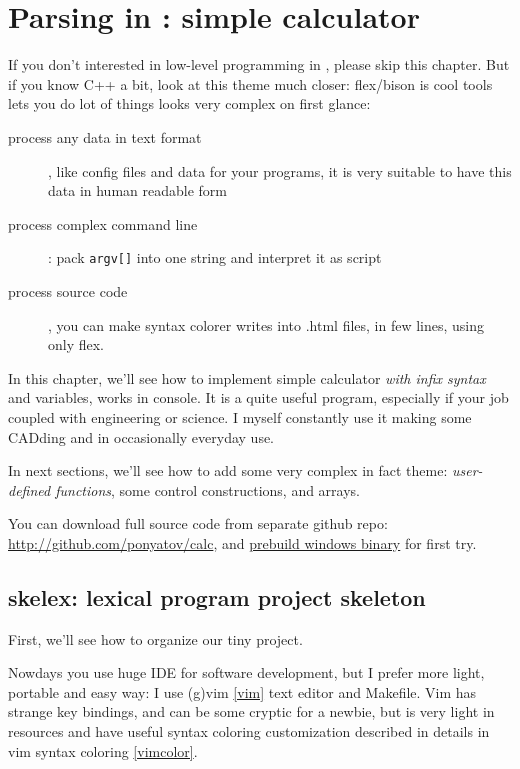 \chapter{Parsing in \cpp: simple calculator}\clearpage

If you don't interested in low-level programming in \cpp, please skip this
chapter. But if you know C++ a bit, look at this theme much closer: flex/bison
is cool tools lets you do lot of things looks very complex on first glance:
\begin{description}
\item[process any data in text format], like config files and data for your
programs, it is very suitable to have this data in human readable form
\item[process complex command line]: pack \verb|argv[]| into one string and
interpret it as script
\item[process source code], you can make syntax colorer writes into .html files,
in few lines, using only flex.
\end{description}

In this chapter, we'll see how to implement simple calculator \textit{with infix
syntax} and variables, works in console. It is a quite useful program,
especially if your job coupled with engineering or science. I myself constantly
use it making some CADding and in occasionally everyday use.

In next sections, we'll see how to add some very complex in fact theme:
\emph{user-defined functions}, some control constructions, and arrays.

\bigskip
You can download full source code from separate github repo:
\url{http://github.com/ponyatov/calc}, and
\href{http://github.com/ponyatov/calc/releases/latest}{prebuild windows
binary} for first try.

\section{skelex: lexical program project skeleton}

First, we'll see how to organize our tiny project.
\bigskip

Nowdays you use huge IDE for software development, but I prefer more light,
portable and easy way: I use (g)vim \ref{vim} text editor and Makefile. Vim has strange key bindings, and can be some
cryptic for a newbie, but is very light in resources and have useful syntax
coloring customization described in details in vim syntax coloring
\ref{vimcolor}.

